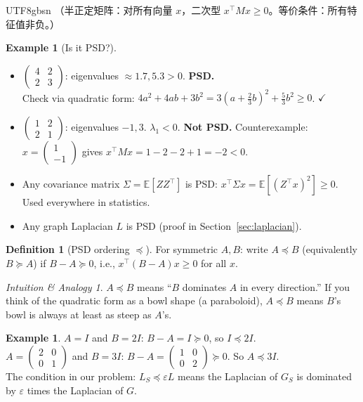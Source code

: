 \documentclass[12pt]{article}
\theoremstyle{definition}
\newtheorem{definition}[theorem]{Definition}
\newtheorem{example}[theorem]{Example}
\theoremstyle{remark}
\newtheorem{intuition}[theorem]{Intuition \& Analogy}
\begin{document}
\begin{CJK}{UTF8}{gbsn}
（半正定矩阵：对所有向量 $x$，二次型 $x^\top Mx \ge 0$。等价条件：所有特征值非负。）
\end{CJK}

\begin{example}[Is it PSD?]
\leavevmode
\begin{itemize}
  \item $\begin{pmatrix}4&2\\2&3\end{pmatrix}$:
        eigenvalues $\approx 1.7, 5.3 > 0$. \textbf{PSD.} \\
        Check via quadratic form: $4a^2+4ab+3b^2 = 3(a+\frac{2}{3}b)^2 + \frac{5}{3}b^2 \ge 0$. $\checkmark$

  \item $\begin{pmatrix}1&2\\2&1\end{pmatrix}$:
        eigenvalues $-1, 3$.  $\lambda_1 < 0$. \textbf{Not PSD.}
        Counterexample: $x = \begin{pmatrix}1\\-1\end{pmatrix}$ gives $x^\top M x = 1-2-2+1 = -2 < 0$.

  \item Any covariance matrix $\Sigma = \mathbb{E}[Z Z^\top]$ is PSD:
        $x^\top \Sigma x = \mathbb{E}[(Z^\top x)^2] \ge 0$. Used everywhere in statistics.

  \item Any graph Laplacian $L$ is PSD (proof in Section~\ref{sec:laplacian}).
\end{itemize}
\end{example}

\begin{definition}[PSD ordering $\preceq$]
For symmetric $A, B$: write $A \preceq B$ (equivalently $B \succeq A$) if $B - A \succeq 0$,
i.e., $x^\top(B - A)x \ge 0$ for all $x$.
\end{definition}

\begin{intuition}
$A \preceq B$ means ``$B$ dominates $A$ in every direction.''
If you think of the quadratic form as a bowl shape (a paraboloid),
$A \preceq B$ means $B$'s bowl is always at least as steep as $A$'s.
\end{intuition}

\begin{example}
$A = I$ and $B = 2I$: $B - A = I \succeq 0$, so $I \preceq 2I$. \\
$A = \begin{pmatrix}2&0\\0&1\end{pmatrix}$ and $B = 3I$:
$B-A = \begin{pmatrix}1&0\\0&2\end{pmatrix} \succeq 0$.  So $A \preceq 3I$.\\
The condition in our problem: $L_S \preceq \varepsilon L$ means the Laplacian of $G_S$
is dominated by $\varepsilon$ times the Laplacian of $G$.
\end{example}
\end{document}
